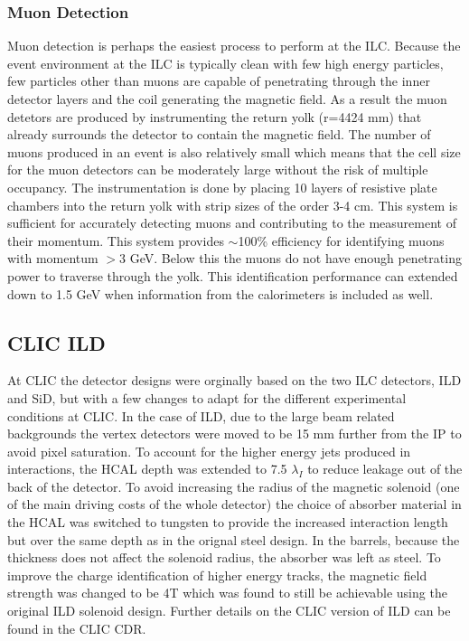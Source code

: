 \subsubsection{Muon Detection}
Muon detection is perhaps the easiest process to perform at the ILC. Because the event environment at the ILC is typically clean with few high energy particles, few particles other than muons are capable of penetrating through the inner detector layers and the coil generating the magnetic field. As a result the muon detetors are produced by instrumenting the return yolk (r=4424 mm) that already surrounds the detector to contain the magnetic field. The number of muons produced in an event is also relatively small which means that the cell size for the muon detectors can be moderately large without the risk of multiple occupancy. The instrumentation is done by placing 10 layers of resistive plate chambers into the return yolk with strip sizes of the order 3-4 cm. This system is sufficient for accurately detecting muons and contributing to the measurement of their momentum. This system provides $\sim$100\% efficiency for identifying muons with momentum $>$3 GeV. Below this the muons do not have enough penetrating power to traverse through the yolk. This identification performance can extended down to 1.5 GeV when information from the calorimeters is included as well.

\subsection{CLIC ILD}

At \ac{CLIC} the detector designs were orginally based on the two \ac{ILC} detectors, \ac{ILD} and \ac{SiD}, but with a few changes to adapt for the different experimental conditions at \ac{CLIC}. In the case of \ac{ILD}, due to the large beam related backgrounds the vertex detectors were moved to be 15 mm further from the \ac{IP} to avoid pixel saturation. To account for the higher energy jets produced in interactions, the \ac{HCAL} depth was extended to 7.5 $\lambda_I$ to reduce leakage out of the back of the detector. To avoid increasing the radius of the magnetic solenoid (one of the main driving costs of the whole detector) the choice of absorber material in the \ac{HCAL} was switched to tungsten to provide the increased interaction length but over the same depth as in the orignal steel design. In the barrels, because the thickness does not affect the solenoid radius, the absorber was left as steel. To improve the charge identification of higher energy tracks, the magnetic field strength was changed to be 4T which was found to still be achievable using the original \ac{ILD} solenoid design. Further details on the CLIC version of \ac{ILD} can be found in the \ac{CLIC} \ac{CDR}\cite{CDR}.

